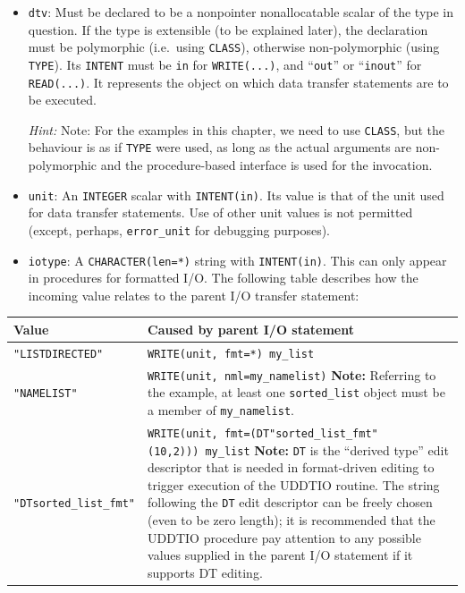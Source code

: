 \documentclass[
  paper=a4,
  ,captions=tableheading
]{scrartcl}
\begin{document}
\begin{itemize}
\item
  \texttt{dtv}: Must be declared to be a nonpointer nonallocatable
  scalar of the type in question. If the type is extensible (to be
  explained later), the declaration must be polymorphic (i.e.~using
  \texttt{CLASS}), otherwise non-polymorphic (using \texttt{TYPE}). Its
  \texttt{INTENT} must be \texttt{in} for \texttt{WRITE(...)}, and
  ``\texttt{out}'' or ``\texttt{inout}'' for \texttt{READ(...)}. It
  represents the object on which data transfer statements are to be
  executed.

  \emph{Hint:} Note: For the examples in this chapter, we need to use
  \texttt{CLASS}, but the behaviour is as if \texttt{TYPE} were used, as
  long as the actual arguments are non-polymorphic and the
  procedure-based interface is used for the invocation.
\item
  \texttt{unit}: An \texttt{INTEGER} scalar with \texttt{INTENT(in)}.
  Its value is that of the unit used for data transfer statements. Use
  of other unit values is not permitted (except, perhaps,
  \texttt{error\_unit} for debugging purposes).
\item
  \texttt{iotype}: A \texttt{CHARACTER(len=*)} string with
  \texttt{INTENT(in)}. This can only appear in procedures for formatted
  I/O. The following table describes how the incoming value relates to
  the parent I/O transfer statement:
\end{itemize}

\begin{longtable}[]{@{}
  >{\raggedright\arraybackslash}p{}
  >{\raggedright\arraybackslash}p{}@{}}
\toprule\noalign{}
\begin{minipage}[b]{\linewidth}\raggedright
Value
\end{minipage} & \begin{minipage}[b]{\linewidth}\raggedright
Caused by parent I/O statement
\end{minipage} \\
\midrule\noalign{}
\endhead
\bottomrule\noalign{}
\endlastfoot
\texttt{"LISTDIRECTED"} & \texttt{WRITE(unit,\ fmt=*)\ my\_list} \\
\texttt{"NAMELIST"} & \texttt{WRITE(unit,\ nml=my\_namelist)}
\textbf{Note:} Referring to the example, at least one
\texttt{sorted\_list} object must be a member of
\texttt{my\_namelist}. \\
\texttt{"DTsorted\_list\_fmt"} &
\texttt{WRITE(unit,\ fmt=\textquotesingle{}(DT"sorted\_list\_fmt"(10,2))\textquotesingle{})\ my\_list}
\textbf{Note:} \texttt{DT} is the ``derived type'' edit descriptor that
is needed in format-driven editing to trigger execution of the UDDTIO
routine. The string following the \texttt{DT} edit descriptor can be
freely chosen (even to be zero length); it is recommended that the
UDDTIO procedure pay attention to any possible values supplied in the
parent I/O statement if it supports DT editing. \\
\end{longtable}
\end{document}

